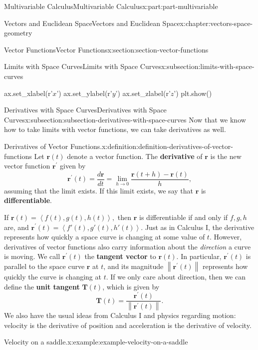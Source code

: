 \documentclass[twoside,10pt,]{tufte-book}
\newcommand{\terminology}[1]{\textbf{#1}}
\numberwithin{equation}{part}
\newcommand{\norm}[1]{\left\| #1 \right\|}
\newcommand{\dotprod}[1]{\left\langle #1 \right\rangle}
\begin{document}
\begin{partptx}{Multivariable Calculus}{}{Multivariable Calculus}{}{}{x:part:part-multivariable}
\begin{chapterptx}{Vectors and Euclidean Space}{}{Vectors and Euclidean Space}{}{}{x:chapter:vectors-space-geometry}
\begin{sectionptx}{Vector Functions}{}{Vector Functions}{}{}{x:section:section-vector-functions}
\begin{subsectionptx}{Limits with Space Curves}{}{Limits with Space Curves}{}{}{x:subsection:limits-with-space-curves}
\begin{sageinput}
ax.set_xlabel(r'$x$')
ax.set_ylabel(r'$y$')
ax.set_zlabel(r'$z$')
plt.show()
\end{sageinput}
\end{subsectionptx}
%
%
\typeout{************************************************}
\typeout{************************************************}
%
\begin{subsectionptx}{Derivatives with Space Curves}{}{Derivatives with Space Curves}{}{}{x:subsection:subsection-derivatives-with-space-curves}
Now that we know how to take limits with vector functions, we can take derivatives as well.%
\begin{definition}{Derivatives of Vector Functions.}{x:definition:definition-derivatives-of-vector-functions}%
%
Let \(\mathbf{r}(t)\) denote a vector function. The \terminology{derivative} of \(\mathbf{r}\) is the new vector function \(\mathbf{r}^\prime\) given by%
%
\begin{equation*}
\mathbf{r}^\prime(t) = \frac{d\mathbf{r}}{dt} = \lim_{h\to0}\frac{\mathbf{r}(t+h)-\mathbf{r}(t)}{h},
\end{equation*}
assuming that the limit exists. If this limit exists, we say that \(\mathbf{r}\) is \terminology{differentiable}.%
\end{definition}
If \(\mathbf{r}(t) = \dotprod{f(t),g(t),h(t)},\) then \(\mathbf{r}\) is differentiable if and only if \(f,g,h\) are, and \(\mathbf{r}^\prime(t) = \dotprod{f'(t),g'(t),h'(t)}.\) Just as in Calculus I, the derivative represents how quickly a space curve is changing at some value of \(t\). However, derivatives of vector functions also carry information about the \emph{direction} a curve is moving. We call \(\mathbf{r}^\prime(t)\) the \terminology{tangent vector} to \(\mathbf{r}(t)\). In particular, \(\mathbf{r}^\prime(t)\) is parallel to the space curve \(\mathbf{r}\) at \(t\), and its magnitude \(\norm{\mathbf{r}^\prime(t)}\) represents how quickly the curve is changing at \(t\). If we only care about direction, then we can define the \terminology{unit tangent} \(\mathbf{T}(t)\), which is given by%
%
\begin{equation*}
\mathbf{T}(t) = \frac{\mathbf{r}^\prime(t)}{\norm{\mathbf{r}^\prime(t)}}.
\end{equation*}
We also have the usual ideas from Calculus I and physics regarding motion: velocity is the derivative of position and acceleration is the derivative of velocity.%
\begin{example}{Velocity on a saddle.}{x:example:example-velocity-on-a-saddle}%

\end{example}
\end{subsectionptx}
\end{sectionptx}
\end{chapterptx}
\end{partptx}
\end{document}
